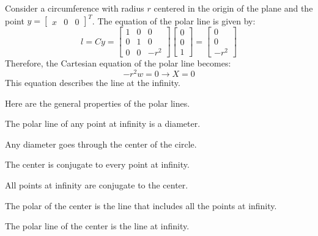 \begin{example}
    Consider a circumference with radius $r$ centered in the origin of the plane and the point $y={\begin{bmatrix} x & 0 & 0 \end{bmatrix}}^T$.
    The equation of the polar line is given by:
    \[
    l=Cy=
    \begin{bmatrix}
        1 & 0 & 0 \\
        0 & 1 & 0 \\
        0 & 0 & -r^2
    \end{bmatrix}    
    \begin{bmatrix}
        0 \\
        0 \\
        1 
    \end{bmatrix}    
    = 
    \begin{bmatrix}
        0 \\
        0 \\
        -r^2 
    \end{bmatrix}  
    \]
    Therefore, the Cartesian equation of the polar line becomes: 
    \[-r^2w=0 \rightarrow X=0\]
    This equation describes the line at the infinity. 
\end{example}
Here are the general properties of the polar lines.
\begin{property}
    The polar line of any point at infinity is a diameter.
\end{property}
\begin{property}
    Any diameter goes through the center of the circle.
\end{property}
\begin{property}
    The center is conjugate to every point at infinity.
\end{property}
\begin{property}
    All points at infinity are conjugate to the center.
\end{property}
\begin{property}
    The polar of the center is the line that includes all the points at infinity.
\end{property}
\begin{property}
    The polar line of the center is the line at infinity.
\end{property}


